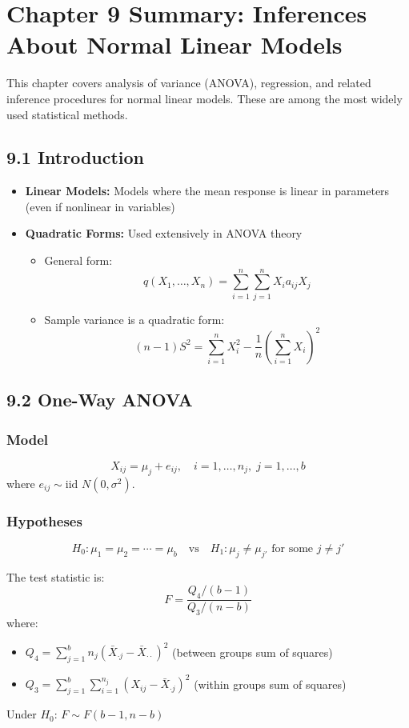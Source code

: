 \section{Chapter 9 Summary: Inferences About Normal Linear Models}

This chapter covers analysis of variance (ANOVA), regression, and related inference procedures for normal linear models. These are among the most widely used statistical methods.

\subsection{9.1 Introduction}

\begin{itemize}
	\item \textbf{Linear Models:} Models where the mean response is linear in parameters (even if nonlinear in variables)
	\item \textbf{Quadratic Forms:} Used extensively in ANOVA theory
	\begin{itemize}
		\item General form: \[
q(X_1, \ldots, X_n) = \sum_{i=1}^n \sum_{j=1}^n X_i a_{ij} X_j
\]
		\item Sample variance is a quadratic form: \[
(n-1)S^2 = \sum_{i=1}^n X_i^2 - \frac{1}{n}\left(\sum_{i=1}^n X_i\right)^2
\]
	\end{itemize}
\end{itemize}

\subsection{9.2 One-Way ANOVA}

\subsubsection{Model}
\[
X_{ij} = \mu_j + e_{ij}, \quad i=1,\ldots,n_j, \; j=1,\ldots,b
\]
where $e_{ij} \sim \text{iid } N(0, \sigma^2)$.

\subsubsection{Hypotheses}
\[
H_0: \mu_1 = \mu_2 = \cdots = \mu_b \quad \text{vs} \quad H_1: \mu_j \neq \mu_{j'} \text{ for some } j \neq j'
\]

\begin{theorem}
The test statistic is:
\[
F = \frac{Q_4/(b-1)}{Q_3/(n-b)}
\]
where:
	\begin{itemize}
		\item $Q_4 = \sum_{j=1}^b n_j(\bar{X}_{\cdot j} - \bar{X}_{\cdot \cdot})^2$ (between groups sum of squares)
		\item $Q_3 = \sum_{j=1}^b \sum_{i=1}^{n_j}(X_{ij} - \bar{X}_{\cdot j})^2$ (within groups sum of squares)
	\end{itemize}
Under $H_0$: $F \sim F(b-1, n-b)$
\end{theorem}
